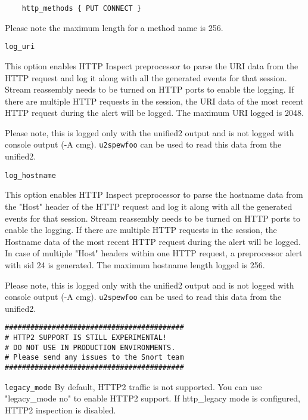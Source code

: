 \documentclass[english]{report}
\newcounter{slistnum}
\newenvironment{slist}
{ \begin{list}{ {\bf \arabic{slistnum}.} }{\usecounter{slistnum} } }
{ \end{list} }
\newenvironment{note}{
\samepage
    \vspace{10pt}{\textsf{
        {\hspace{7pt}\Huge{$\triangle$\hspace{-12.5pt}{\Large{$^!$}}}}\hspace{5pt}
        {\Large{NOTE}}
    }
    }
   \begin{center}
    \par\vspace{-17pt}

    \begin{lrbox}{\savepar}
    \begin{minipage}[r]{6in}
}
{
    \end{minipage}
    \end{lrbox}
    \fbox{
        \usebox{
            \savepar
	}
    }
    \par\vskip10pt
    \end{center}
}
\newenvironment{note}{
        \begin{rawhtml}
        <p><table border="1"><tr><td><b>
        Note:&nbsp;&nbsp;</b>
        \end{rawhtml}
}{
        \begin{rawhtml}
        </b></td></tr></table></p>
        \end{rawhtml}
}
\begin{document}
\begin{slist}
\begin{verbatim}
    http_methods { PUT CONNECT }
\end{verbatim}

\begin{note}

Please note the maximum length for a method name is 256.

\end{note}

\item \texttt{log\_uri}

This option enables HTTP Inspect preprocessor to parse the URI data from the
HTTP request and log it along with all the generated events for that session.
Stream reassembly needs to be turned on HTTP ports to enable the logging.
If there are multiple HTTP requests in the session, the URI data of the most recent
HTTP request during the alert will be logged. The maximum URI logged is 2048.

\begin{note}

Please note, this is logged only with the unified2 output and is not logged
with console output (-A cmg). \texttt{u2spewfoo} can be used to read this data from
the unified2.

\end{note}

\item \texttt{log\_hostname}

This option enables HTTP Inspect preprocessor to parse the hostname data from the
"Host" header of the HTTP request and log it along with all the generated events
for that session. Stream reassembly needs to be turned on HTTP ports to enable
the logging. If there are multiple HTTP requests in the session, the Hostname data
of the most recent HTTP request during the alert will be logged. In case of
multiple "Host" headers within one HTTP request, a preprocessor alert with sid 24 is
generated. The maximum hostname length logged is 256.

\begin{note}

Please note, this is logged only with the unified2 output and is not logged
with console output (-A cmg). \texttt{u2spewfoo} can be used to read this data from
the unified2.

\end{note}

\begin{verbatim}
##########################################
# HTTP2 SUPPORT IS STILL EXPERIMENTAL!
# DO NOT USE IN PRODUCTION ENVIRONMENTS.
# Please send any issues to the Snort team
##########################################
\end{verbatim}

\item \texttt{legacy\_mode}
By default, HTTP2 traffic is not supported. You can use "legacy\_mode no"
to enable HTTP2 support.
If http\_legacy mode is configured, HTTP2 inspection is disabled.

\end{slist}
\end{document}
